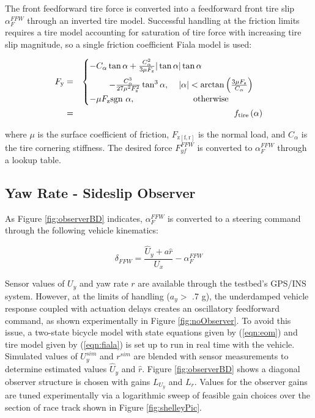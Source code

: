 \documentclass[twocolumn,10pt]{asme2e}
\begin{document}
The front feedforward tire force is converted into a feedforward front tire slip $\alpha^{FFW}_F$ through an inverted tire model. Successful handling at the friction limits requires a tire model accounting for saturation of tire force
with increasing tire slip magnitude, so a single friction coefficient Fiala model \cite{pacejka2012} is used: 

\begin{eqnarray}
	F_\mathrm{y}&=&\begin{cases} -C_{\alpha}\tan\alpha + \frac{C_{\alpha}^2}{3\mu F_\mathrm{z}} |\tan\alpha| \tan\alpha \vspace{2mm} \\ \hspace{8mm}- \frac{C_{\alpha}^3}{27\mu^2F_\mathrm{z}^2}\tan^3\alpha,
\hspace{4mm}  |\alpha| < \arctan{\left(\frac{3\mu F_\mathrm{z}}{C_\alpha}\right)} \\ -\mu F_\mathrm{z}\text{sgn} \ \alpha, \hspace{24mm} \mathrm{otherwise} \end{cases} \nonumber\\
&=&f_{\mathrm{tire}}\left(\alpha\right) \label{eqn:fiala}
\end{eqnarray}

where $\mu$ is the surface coefficient of friction, $F_\mathrm{z[f,r]}$ is the normal load, and $C_\alpha$ is the tire cornering stiffness. The desired force $F^{FFW}_{yf}$ is converted to $\alpha^{FFW}_F$
through a lookup table.

\subsection{Yaw Rate - Sideslip Observer}

As Figure \ref{fig:observerBD} indicates, $\alpha^{FFW}_F$ is converted to a steering command through the following vehicle kinematics:

\begin{equation}
	\delta_{FFW} = \frac{\hat{U}_y+a\hat{r}}{U_x}-\alpha^{FFW}_F
\label{eqn:alphaToDelta}
\end{equation}

Sensor values of $U_y$ and yaw rate $r$ are available through the testbed's GPS/INS system. However, at the limits of handling ($a_y > $ .7 g), the underdamped vehicle response coupled with actuation delays creates
an oscillatory feedforward command, as shown experimentally in Figure \ref{fig:noObserver}. To avoid this issue, a two-state bicycle model with state equations given by (\ref{eqn:eom}) and tire model given by (\ref{eqn:fiala}) is set up to run in real time with the vehicle. Simulated values
of $U^{sim}_y$ and $r^{sim}$ are blended with sensor measurements to determine estimated values $\hat{U}_y$ and $\hat{r}$.  Figure \ref{fig:observerBD} shows a diagonal observer structure is chosen with gains $L_{U_y}$  and $L_r$. Values for the
observer gains are tuned experimentally via a logarithmic sweep of feasible gain choices over the section of race track shown in Figure \ref{fig:shelleyPic}.
\end{document}
